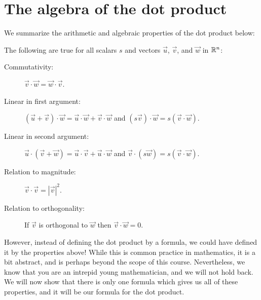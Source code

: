 \documentclass{ximera}
\begin{document}
\section{The algebra of the dot product}

We summarize the arithmetic and algebraic properties of the dot
product below:
\begin{theorem}
  The following are true for all scalars $s$ and vectors
  $\vec{u}$, $\vec{v}$, and $\vec{w}$ in $\mathbb R^n$:
  \begin{description}
  \item[Commutativity:] $\vec{v} \cdot \vec{w} = \vec{w} \cdot
    \vec{v}$.
  \item[Linear in first argument:] $(\vec{u}+\vec{v})\cdot \vec{w} = \vec{u}\cdot \vec{w} +
    \vec{v}\cdot \vec{w}$ and $(s\vec{v})\cdot \vec{w} = s(\vec{v}
    \cdot \vec{w})$.
  \item[Linear in second argument:] $\vec{u} \cdot (\vec{v}+\vec{w}) = \vec{u}\cdot \vec{v}+
    \vec{u}\cdot \vec{w}$ and $\vec{v} \cdot (s\vec{w}) = s(\vec{v}
    \cdot \vec{w})$.
  \item[Relation to magnitude:] $\vec{v} \cdot \vec{v} = |\vec{v}|^2$.
  \item[Relation to orthogonality:] If $\vec{v}$ is orthogonal to
    $\vec{w}$ then $\vec{v} \cdot \vec{w} = 0$.
  \end{description}
\end{theorem}

However, instead of defining the dot product by a formula, we could
have defined it by the properties above!  While this is common
practice in mathematics, it is a bit abstract, and is perhaps beyond
the scope of this course. Nevertheless, we know that you are an
intrepid young mathematician, and we will not hold back.  We will now
show that there is only one formula which gives us all of these
properties, and it will be our formula for the dot product.
\end{document}
